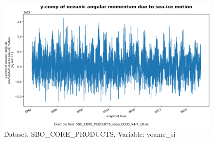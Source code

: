 \begin{figure}[H]
\centering
\includegraphics[scale=0.55]{../images/plots/oneD_plots/SBO_Core_Products/yoamc_si.png}
\caption{Dataset: SBO\_CORE\_PRODUCTS, Variable: yoamc\_si}
\label{tab:table-SBO_CORE_PRODUCTS_yoamc_si-Plot}
\end{figure}
\pagebreak
